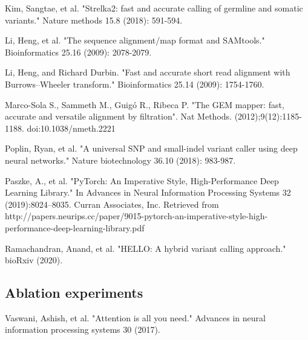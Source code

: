 \documentclass[]{article}
\begin{document}
\vspace{8pt}
Kim, Sangtae, et al. "Strelka2: fast and accurate calling of germline and somatic variants." Nature methods 15.8 (2018): 591-594.

\vspace{8pt}
Li, Heng, et al. "The sequence alignment/map format and SAMtools." Bioinformatics 25.16 (2009): 2078-2079.

\vspace{8pt}
Li, Heng, and Richard Durbin. "Fast and accurate short read alignment with Burrows–Wheeler transform." Bioinformatics 25.14 (2009): 1754-1760.

\vspace{8pt}
Marco-Sola S., Sammeth M., Guigó R., Ribeca P. "The GEM mapper: fast, accurate and versatile alignment by filtration". Nat Methods. (2012);9(12):1185-1188. doi:10.1038/nmeth.2221

\vspace{8pt}
Poplin, Ryan, et al. "A universal SNP and small-indel variant caller using deep neural networks." Nature biotechnology 36.10 (2018): 983-987.
 
\vspace{8pt}
Paszke, A., et al. "PyTorch: An Imperative Style, High-Performance Deep Learning Library." In Advances in Neural Information Processing Systems 32 (2019):8024–8035. Curran Associates, Inc. Retrieved from http://papers.neurips.cc/paper/9015-pytorch-an-imperative-style-high-performance-deep-learning-library.pdf

\vspace{8pt}
Ramachandran, Anand, et al. "HELLO: A hybrid variant calling approach." bioRxiv (2020).
 

 \vspace{8pt}
 \subsection{Ablation experiments}
Vaswani, Ashish, et al. "Attention is all you need." Advances in neural information processing systems 30 (2017).
\end{document}
